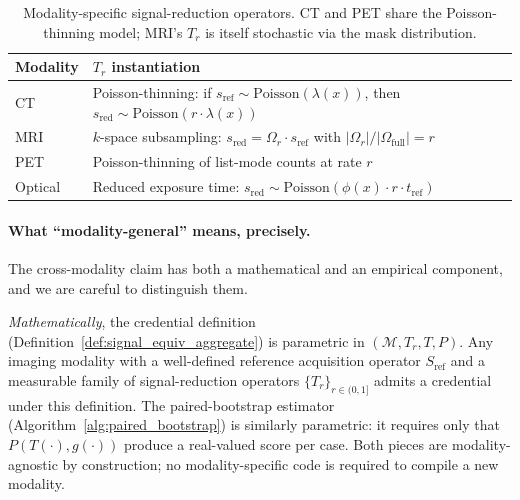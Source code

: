 \documentclass[twoside,11pt]{article}
\newcommand{\Sref}{S_{\textrm{ref}}}
\begin{document}
\begin{table}[h]
    \centering
    \begin{tabular}{lp{9cm}}
        \toprule
        \textbf{Modality} & \textbf{$T_r$ instantiation} \\
        \midrule
        CT  & Poisson-thinning: if $s_{\textrm{ref}} \sim \textrm{Poisson}(\lambda(x))$, then $s_{\textrm{red}} \sim \textrm{Poisson}(r \cdot \lambda(x))$ \\
        MRI & $k$-space subsampling: $s_{\textrm{red}} = \Omega_r \cdot s_{\textrm{ref}}$ with $|\Omega_r|/|\Omega_{\textrm{full}}| = r$ \\
        PET & Poisson-thinning of list-mode counts at rate $r$\footnotemark[1] \\
        Optical & Reduced exposure time: $s_{\textrm{red}} \sim \textrm{Poisson}(\phi(x) \cdot r \cdot t_{\textrm{ref}})$ \\
        \bottomrule
    \end{tabular}
    \caption{Modality-specific signal-reduction operators. CT and PET share the Poisson-thinning model; MRI's $T_r$ is itself stochastic via the mask distribution.}
    \label{tab:modality_Tr}
\end{table}

\paragraph{What ``modality-general'' means, precisely.} The cross-modality claim has both a mathematical and an empirical component, and we are careful to distinguish them.

\textit{Mathematically}, the credential definition (Definition~\ref{def:signal_equiv_aggregate}) is parametric in $(\mathcal{M}, T_r, T, P)$. Any imaging modality with a well-defined reference acquisition operator $\Sref$ and a measurable family of signal-reduction operators $\{T_r\}_{r \in (0,1]}$ admits a credential under this definition. The paired-bootstrap estimator (Algorithm~\ref{alg:paired_bootstrap}) is similarly parametric: it requires only that $P(T(\cdot), g(\cdot))$ produce a real-valued score per case. Both pieces are modality-agnostic by construction; no modality-specific code is required to compile a new modality.
\end{document}

